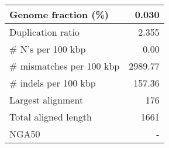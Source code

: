 \documentclass[12pt,a4paper]{article}
\begin{document}
\begin{table}[ht]
\begin{center}
\begin{tabular}{|l*{1}{|r}|}
Genome fraction (\%) & 0.030 \\ \hline
Duplication ratio & 2.355 \\ \hline
\# N's per 100 kbp & 0.00 \\ \hline
\# mismatches per 100 kbp & 2989.77 \\ \hline
\# indels per 100 kbp & 157.36 \\ \hline
Largest alignment & 176 \\ \hline
Total aligned length & 1661 \\ \hline
NGA50 & - \\ \hline
\end{tabular}
\end{center}
\end{table}
\end{document}
